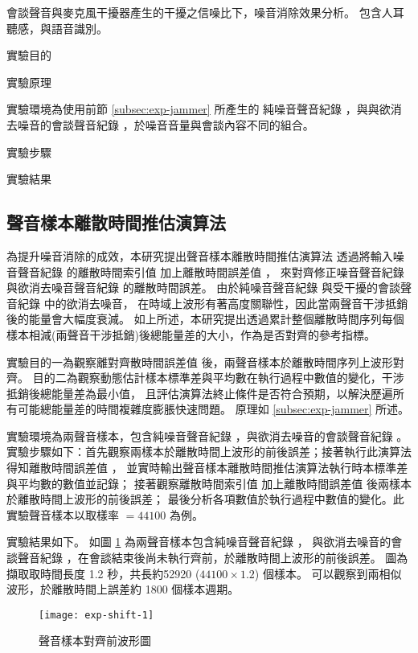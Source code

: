     會談聲音與麥克風干擾器產生的干擾之信噪比下，噪音消除效果分析。
包含人耳聽感，與語音識別。

    實驗目的

    實驗原理

    實驗環境為使用前節 \ref{subsec:exp-jammer}  所產生的
純噪音聲音紀錄 \DEFrecN，與與欲消去噪音的會談聲音紀錄 \DEFrecJ，於噪音音量與會談內容不同的組合。

    實驗步驟

    實驗結果


\subsection{聲音樣本離散時間推估演算法}

    為提升噪音消除的成效，本研究提出聲音樣本離散時間推估演算法
透過將輸入噪音聲音紀錄 \DEFrecN 的離散時間索引值 \DEFpause 加上離散時間誤差值 \DEFshift，
來對齊修正噪音聲音紀錄 \DEFrecN 與欲消去噪音聲音紀錄 \DEFrecJ 的離散時間誤差。
由於純噪音聲音紀錄 \DEFrecN 與受干擾的會談聲音紀錄 \DEFrecJ 中的欲消去噪音，
在時域上波形有著高度關聯性，因此當兩聲音干涉抵銷後的能量會大幅度衰減。
如上所述，本研究提出透過累計整個離散時間序列每個樣本相減(兩聲音干涉抵銷)後總能量差的大小，作為是否對齊的參考指標。

    實驗目的一為觀察離對齊散時間誤差值 \DEFshift 後，兩聲音樣本於離散時間序列上波形對齊。
目的二為觀察動態估計樣本標準差與平均數在執行過程中數值的變化，干涉抵銷後總能量差為最小值，
且評估演算法終止條件是否符合預期，以解決歷遍所有可能總能量差的時間複雜度膨脹快速問題。
原理如 \ref{subsec:exp-jammer} 所述。

    實驗環境為兩聲音樣本，包含純噪音聲音紀錄 \DEFrecN，與欲消去噪音的會談聲音紀錄 \DEFrecJ。
實驗步驟如下：首先觀察兩樣本於離散時間上波形的前後誤差；接著執行此演算法得知離散時間誤差值 \DEFshift，
並實時輸出聲音樣本離散時間推估演算法執行時本標準差與平均數的數值並記錄；
接著觀察離散時間索引值 \DEFpause 加上離散時間誤差值 \DEFshift 後兩樣本於離散時間上波形的前後誤差；
最後分析各項數值於執行過程中數值的變化。此實驗聲音樣本以取樣率 \DEFsamplerate $= 44100$ 為例。

    實驗結果如下。
如圖 \ref{fig:exp-shift-1} 為兩聲音樣本包含純噪音聲音紀錄 \DEFrecN，
與欲消去噪音的會談聲音紀錄 \DEFrecJ，在會談結束後尚未執行齊前，於離散時間上波形的前後誤差。
圖為擷取取時間長度 1.2 秒，共長約52920 ($44100 \times 1.2 $) 個樣本。
可以觀察到兩相似波形，於離散時間上誤差約 1800 個樣本週期。

\begin{figure}[H]
    \centering
    \texttt{[image: exp-shift-1]}
    \caption{聲音樣本對齊前波形圖}\label{fig:exp-shift-1}
\end{figure}

